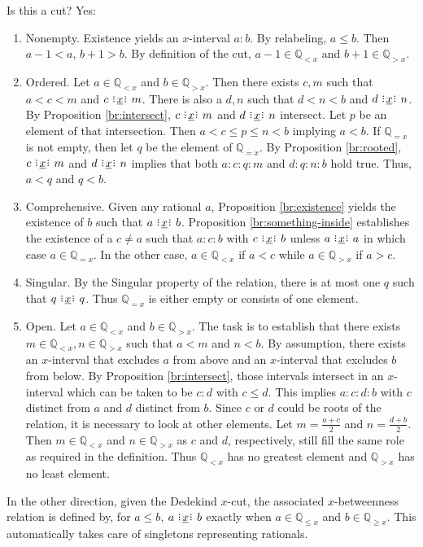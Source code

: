 \documentclass[12pt]{article}
\newcommand{\qcut}[2][x]{\ensuremath{\mathbb{Q}_{#2 #1}}}
\newcommand{\qlt}[1][x]{\qcut[#1]{<}}
\newcommand{\qeq}[1][x]{\qcut[#1]{=}}
\newcommand{\qgt}[1][x]{\qcut[#1]{>}}
\newcommand{\qgeq}[1][x]{\qcut[#1]{\geq}}
\newcommand{\qleq}[1][x]{\qcut[#1]{\leq}}
\begin{document}
Is this a cut? Yes: 
\begin{enumerate}
    \item Nonempty. Existence yields an $x$-interval $a:b$. By relabeling, $a \leq b$. Then $a-1< a$, $b+1 > b$. By definition of the cut, $a-1 \in \qlt$ and $b+1 \in \qgt$.
    \item Ordered. Let $a \in \qlt$ and $b \in \qgt$.  Then there exists $c, m$ such that $a < c < m$ and $c \xrel m$. There is also a $d, n$ such that $d < n< b$  and $d \xrel n$. By Proposition \ref{br:intersect}, $c \xrel m$ and $d \xrel n$ intersect. Let $p$ be an element of that intersection. Then $a < c \leq p \leq n < b$ implying $a < b$.  If $\qeq$ is not empty, then let $q$ be the element of $\qeq$. By Proposition \ref{br:rooted}, $c \xrel m$ and $d \xrel n$ implies that both $a:c:q:m$ and $d:q:n:b$ hold true. Thus, $a < q$ and $q < b$.  
    \item Comprehensive. Given any rational $a$, Proposition \ref{br:existence} yields the existence of $b$ such that $a \xrel b$. Proposition \ref{br:something-inside} establishes the existence of a $c \neq a$ such that $a:c:b$ with $c \xrel b$ unless $a \xrel a$ in which case $a \in \qeq$. In the other case, $a \in \qlt$ if $a < c$ while $a  \in \qgt$ if $a > c$. 
    \item Singular. By the Singular property of the relation, there is at most one $q$ such that $q \xrel q$. Thus $\qeq$ is either empty or consists of one element. 
    \item Open. Let $a\in \qlt$ and $b \in \qgt$. The task is to establish that there exists $m \in \qlt, n \in \qgt$ such that $a < m$ and $n < b$. By assumption, there exists an $x$-interval that excludes $a$ from above and an $x$-interval that excludes $b$ from below. By Proposition \ref{br:intersect}, those intervals intersect in an $x$-interval which can be taken to be $c:d$ with $c \leq d$. This implies $a:c:d:b$ with $c$ distinct from $a$ and $d$ distinct from $b$. Since $c$ or $d$ could be roots of the relation, it is necessary to look at other elements. Let $m = \frac{a+c}{2}$ and $n = \frac{d+b}{2}$. Then $m \in \qlt$ and $n \in \qgt$ as $c$ and $d$, respectively, still fill the same role as required in the definition. Thus $\qlt$ has no greatest element and $\qgt$ has no least element. 
\end{enumerate}

In the other direction, given the Dedekind $x$-cut, the associated $x$-betweenness relation is defined by, for $a \leq b$, $a \xrel b$ exactly when $a \in \qleq$ and $b \in \qgeq$. This automatically takes care of singletons representing rationals. 
\end{document}
